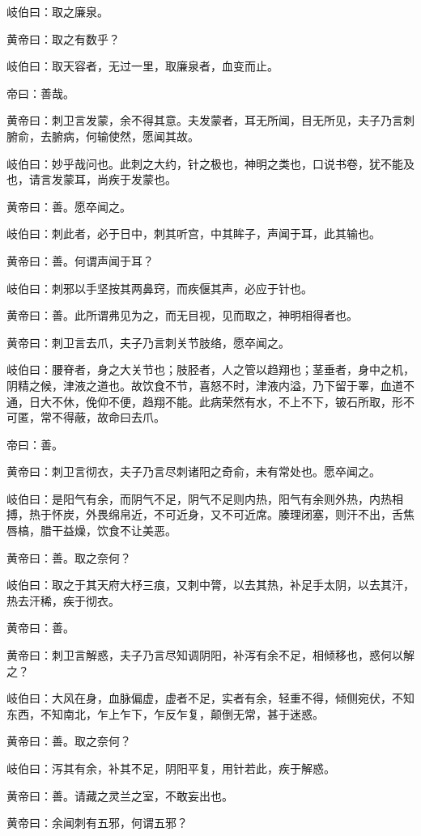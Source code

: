 \documentclass[a4paper,12pt,UTF8,twoside]{ctexbook}
\begin{document}
	岐伯曰：取之廉泉。
	
	黄帝曰：取之有数乎？
	
	岐伯曰：取天容者，无过一里，取廉泉者，血变而止。
	
	帝曰：善哉。
	
	黄帝曰：刺卫言发蒙，余不得其意。夫发蒙者，耳无所闻，目无所见，夫子乃言刺腑俞，去腑病，何输使然，愿闻其故。
	
	岐伯曰：妙乎哉问也。此刺之大约，针之极也，神明之类也，口说书卷，犹不能及也，请言发蒙耳，尚疾于发蒙也。
	
	黄帝曰：善。愿卒闻之。
	
	岐伯曰：刺此者，必于日中，刺其听宫，中其眸子，声闻于耳，此其输也。
	
	黄帝曰：善。何谓声闻于耳？
	
	岐伯曰：刺邪以手坚按其两鼻窍，而疾偃其声，必应于针也。
	
	黄帝曰：善。此所谓弗见为之，而无目视，见而取之，神明相得者也。
	
	黄帝曰：刺卫言去爪，夫子乃言刺关节肢络，愿卒闻之。
	
	岐伯曰：腰脊者，身之大关节也；肢胫者，人之管以趋翔也；茎垂者，身中之机，阴精之候，津液之道也。故饮食不节，喜怒不时，津液内溢，乃下留于睪，血道不通，日大不休，俛仰不便，趋翔不能。此病荣然有水，不上不下，铍石所取，形不可匿，常不得蔽，故命曰去爪。
	
	帝曰：善。
	
	黄帝曰：刺卫言彻衣，夫子乃言尽刺诸阳之奇俞，未有常处也。愿卒闻之。
	
	岐伯曰：是阳气有余，而阴气不足，阴气不足则内热，阳气有余则外热，内热相搏，热于怀炭，外畏绵帛近，不可近身，又不可近席。腠理闭塞，则汗不出，舌焦唇槁，腊干益燥，饮食不让美恶。
	
	黄帝曰：善。取之奈何？
	
	岐伯曰：取之于其天府大杼三痕，又刺中膂，以去其热，补足手太阴，以去其汗，热去汗稀，疾于彻衣。
	
	黄帝曰：善。
	
	黄帝曰：刺卫言解惑，夫子乃言尽知调阴阳，补泻有余不足，相倾移也，惑何以解之？
	
	岐伯曰：大风在身，血脉偏虚，虚者不足，实者有余，轻重不得，倾侧宛伏，不知东西，不知南北，乍上乍下，乍反乍复，颠倒无常，甚于迷惑。
	
	黄帝曰：善。取之奈何？
	
	岐伯曰：泻其有余，补其不足，阴阳平复，用针若此，疾于解惑。
	
	黄帝曰：善。请藏之灵兰之室，不敢妄出也。
	
	黄帝曰：余闻刺有五邪，何谓五邪？
	
\end{document}

